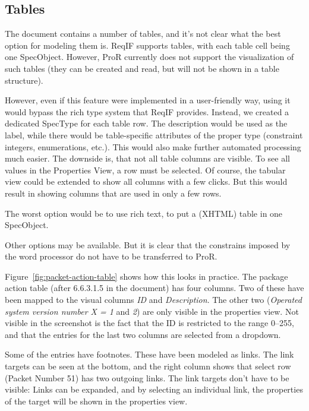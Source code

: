 \documentclass{template/openetcs_report}
\begin{document}
\subsection{Tables}

The document contains a number of tables, and it's not clear what the best option for modeling them is.  ReqIF supports tables, with each table cell being one SpecObject.  However, ProR currently does not support the visualization of such tables (they can be created and read, but will not be shown in a table structure).

However, even if this feature were implemented in a user-friendly way, using it would bypass the rich type system that ReqIF provides.  Instead, we created a dedicated SpecType for each table row.  The description would be used as the label, while there would be table-specific attributes of the proper type (constraint integers, enumerations, etc.).  This would also make further automated processing much easier.  The downside is, that not all table columns are visible.  To see all values in the Properties View, a row must be selected.  Of course, the tabular view could be extended to show all columns with a few clicks.  But this would result in showing columns that are used in only a few rows.

The worst option would be to use rich text, to put a (XHTML) table in one SpecObject.

Other options may be available.  But it is clear that the constrains imposed by the word processor do not have to be transferred to ProR.

Figure~\ref{fig:packet-action-table} shows how this looks in practice.  The package action table (after 6.6.3.1.5 in the document) has four columns.  Two of these have been mapped to the visual columns \emph{ID} and \emph{Description}.  The other two (\emph{Operated system version number X = 1} and \emph{2}) are only visible in the properties view.  Not visible in the screenshot is the fact that the ID is restricted to the range 0--255, and that the entries for the last two columns are selected from a dropdown.

Some of the entries have footnotes.  These have been modeled as links.  The link targets can be seen at the bottom, and the right column shows that select row (Packet Number 51) has two outgoing links.  The link targets don't have to be visible: Links can be expanded, and by selecting an individual link, the properties of the target will be shown in the properties view.
\end{document}

